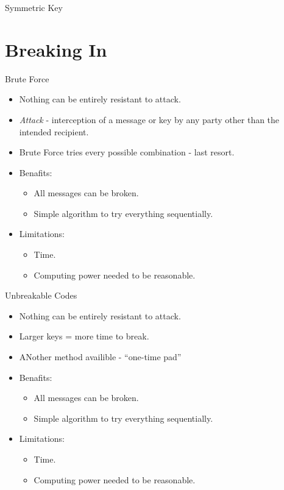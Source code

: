 \documentclass{beamer}
\begin{document}
\begin{frame}{Symmetric Key}
	\begin{centering}
		\par
	\end{centering}
\end{frame}

\section{Breaking In}

\begin{frame}{Brute Force}
	\begin{itemize}
		\item Nothing can be entirely resistant to attack.
		\item \emph{Attack} - interception of a message or key by any party other than the intended recipient.
		\item Brute Force tries every possible combination - last resort.
		\item Benafits:
	 	\begin{itemize}
			\item All messages can be broken.
			\item Simple algorithm to try everything sequentially.
		\end{itemize}
		\item Limitations:
		\begin{itemize}
			\item Time.
			\item Computing power needed to be reasonable.
		\end{itemize}
	\end{itemize}
\end{frame}

\begin{frame}{Unbreakable Codes}
	\begin{itemize}
		\item Nothing can be entirely resistant to attack.
		\item Larger keys = more time to break.
		\item ANother method availible - ``one-time pad''
		\item Benafits:
	 	\begin{itemize}
			\item All messages can be broken.
			\item Simple algorithm to try everything sequentially.
		\end{itemize}
		\item Limitations:
		\begin{itemize}
			\item Time.
			\item Computing power needed to be reasonable.
		\end{itemize}
	\end{itemize}
\end{frame}
\end{document}
